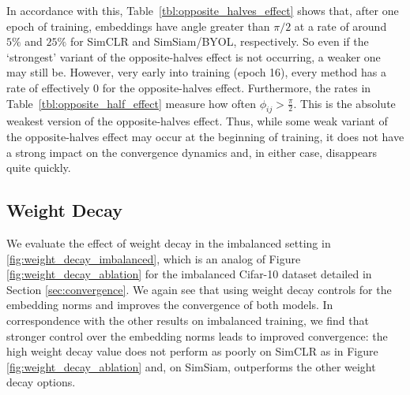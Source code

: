 In accordance with this, Table~\ref{tbl:opposite_halves_effect} shows that, after one epoch of training, embeddings have angle greater than $\pi/2$ at a rate of around $5\%$ and $25\%$ for SimCLR and SimSiam/BYOL, respectively. So even if the `strongest' variant of the opposite-halves effect is not occurring, a weaker one may still be. However, very early into training (epoch 16), every method has a rate of effectively 0 for the opposite-halves effect. Furthermore, the rates in Table~\ref{tbl:opposite_half_effect} measure how often $\phi_{ij} > \frac{\pi}{2}$. This is the absolute weakest version of the opposite-halves effect. Thus, while some weak variant of the opposite-halves effect may occur at the beginning of training, it does not have a strong impact on the convergence dynamics and, in either case, disappears quite quickly.

\subsection{Weight Decay}
\label{app:weight_decay}

We evaluate the effect of weight decay in the imbalanced setting in \ref{fig:weight_decay_imbalanced}, which is an analog of Figure \ref{fig:weight_decay_ablation} for the imbalanced Cifar-10 dataset detailed in Section \ref{sec:convergence}. We again see that using weight decay controls for the embedding norms and improves the convergence of both models. In correspondence with the other results on imbalanced training, we find that stronger control over the embedding norms leads to improved convergence: the high weight decay value does not perform as poorly on SimCLR as in Figure \ref{fig:weight_decay_ablation} and, on SimSiam, outperforms the other weight decay options.

